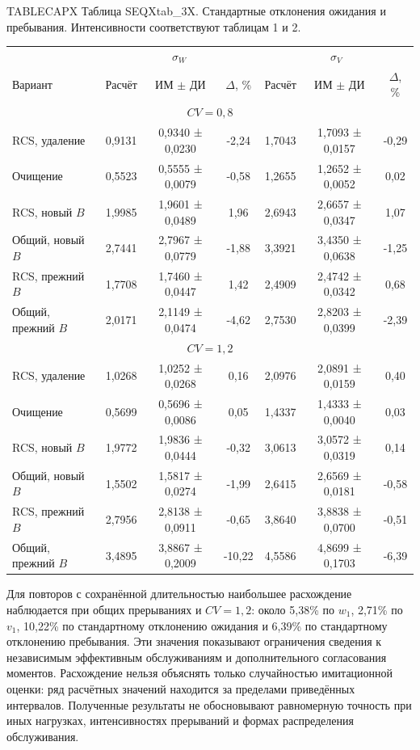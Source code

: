 \noindent TABLECAPX Таблица SEQXtab_3X. Стандартные отклонения ожидания и пребывания. Интенсивности соответствуют таблицам 1 и 2.\par

\setlength{\tabcolsep}{3pt}
\begin{tabular}{lcccccc}
\toprule
 & \multicolumn{3}{c}{$\sigma_W$} & \multicolumn{3}{c}{$\sigma_V$} \\
Вариант & Расчёт & ИМ $\pm$ ДИ & $\Delta$, \% & Расчёт & ИМ $\pm$ ДИ & $\Delta$, \% \\
\midrule
\multicolumn{7}{c}{$CV=0,8$} \\
RCS, удаление & 0,9131 & 0,9340 ± 0,0230 & -2,24 & 1,7043 & 1,7093 ± 0,0157 & -0,29 \\
Очищение & 0,5523 & 0,5555 ± 0,0079 & -0,58 & 1,2655 & 1,2652 ± 0,0052 & 0,02 \\
RCS, новый $B$ & 1,9985 & 1,9601 ± 0,0489 & 1,96 & 2,6943 & 2,6657 ± 0,0347 & 1,07 \\
Общий, новый $B$ & 2,7441 & 2,7967 ± 0,0779 & -1,88 & 3,3921 & 3,4350 ± 0,0638 & -1,25 \\
RCS, прежний $B$ & 1,7708 & 1,7460 ± 0,0447 & 1,42 & 2,4909 & 2,4742 ± 0,0342 & 0,68 \\
Общий, прежний $B$ & 2,0171 & 2,1149 ± 0,0474 & -4,62 & 2,7530 & 2,8203 ± 0,0399 & -2,39 \\
\multicolumn{7}{c}{$CV=1,2$} \\
RCS, удаление & 1,0268 & 1,0252 ± 0,0268 & 0,16 & 2,0976 & 2,0891 ± 0,0159 & 0,40 \\
Очищение & 0,5699 & 0,5696 ± 0,0086 & 0,05 & 1,4337 & 1,4333 ± 0,0040 & 0,03 \\
RCS, новый $B$ & 1,9772 & 1,9836 ± 0,0444 & -0,32 & 3,0613 & 3,0572 ± 0,0319 & 0,14 \\
Общий, новый $B$ & 1,5502 & 1,5817 ± 0,0274 & -1,99 & 2,6415 & 2,6569 ± 0,0181 & -0,58 \\
RCS, прежний $B$ & 2,7956 & 2,8138 ± 0,0911 & -0,65 & 3,8640 & 3,8838 ± 0,0700 & -0,51 \\
Общий, прежний $B$ & 3,4895 & 3,8867 ± 0,2009 & -10,22 & 4,5586 & 4,8699 ± 0,1703 & -6,39 \\
\bottomrule
\end{tabular}





Для повторов с сохранённой длительностью наибольшее расхождение наблюдается при общих прерываниях и \(CV=1{,}2\): около 5{,}38\% по \(w_1\), 2{,}71\% по \(v_1\), 10{,}22\% по стандартному отклонению ожидания и 6{,}39\% по стандартному отклонению пребывания. Эти значения показывают ограничения сведения к независимым эффективным обслуживаниям и дополнительного согласования моментов. Расхождение нельзя объяснять только случайностью имитационной оценки: ряд расчётных значений находится за пределами приведённых интервалов. Полученные результаты не обосновывают равномерную точность при иных нагрузках, интенсивностях прерываний и формах распределения обслуживания.


